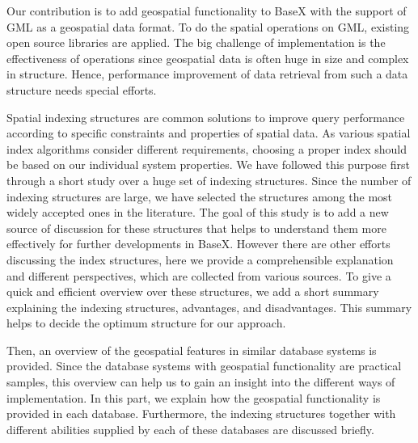 \documentclass[a4paper,12pt]{article}
\begin{document}
Our contribution is to add geospatial functionality to BaseX with the support of GML as a geospatial data format. 
To do the spatial operations on GML, existing open source libraries are applied.
The big challenge of implementation is the effectiveness of operations
since geospatial data is often huge in size and complex in structure.
Hence, performance improvement of data retrieval from such a data structure 
needs special efforts. 

Spatial indexing structures are common solutions to improve query performance according to specific constraints and properties of spatial data.
As various spatial index algorithms consider different requirements, choosing a proper index should be based on our individual system properties.
We have followed this purpose first through a short study over a huge set of indexing structures.
Since the number of indexing structures are large, 
we have selected the structures among the most widely accepted ones in the literature.
The goal of this study is to add a new source of discussion 
for these structures that helps to understand them more effectively for further developments in BaseX. 
However there are other efforts discussing the index structures, 
here we provide a comprehensible explanation and different perspectives, which are collected from various sources.
To give a quick and efficient overview over these structures, 
we add a short summary explaining the indexing structures, advantages, and disadvantages.
This summary helps to decide the optimum structure for our approach. 

Then, an overview of the geospatial features in similar database systems is provided. Since the database systems with geospatial functionality are practical samples, this overview can help us to gain an insight into the different ways of implementation. %
In this part, we explain how the geospatial functionality is provided in each database.
Furthermore, the indexing structures together with different abilities
supplied by each of these databases are discussed briefly.
\end{document}
